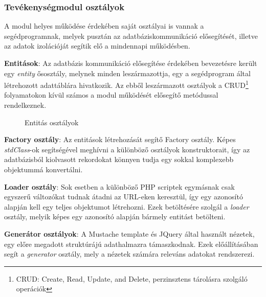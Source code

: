 \subsubsection{Tevékenységmodul osztályok}

A modul helyes működése érdekében saját osztályai is vannak a segédprogramnak, melyek pusztán az adatbáziskommunikáció elősegítését, illetve az adatok izolációját segítik elő a mindennapi működésben. 

\begin{compactitem}
    \item \textbf{Entitások}: Az adatbázis kommunikáció elősegítése érdekében bevezetésre került egy \textit{entity} ősosztály, melynek minden leszármazottja, egy a segédprogram által létrehozott adattáblára hivatkozik. Az ebből leszármazott osztályok a CRUD\footnote{CRUD: Create, Read, Update, and Delete, perzinsztens tárolásra szolgáló operációk} folyamatokon kívül számos a modul működését elősegítő metódussal rendelkeznek.

\begin{figure}[H]
	\caption{Entitás osztályok}
\end{figure}
    
    \item \textbf{Factory osztály}: Az entitások létrehozását segítő Factory osztály. Képes \textit{stdClass}-ok segítségével meghívni a különböző osztályok konstruktorait, így az adatbázisból kiolvasott rekordokat könnyen tudja egy sokkal komplexebb objektummá konvertálni.
    \item \textbf{Loader osztály}: Sok esetben a különböző PHP scriptek egymásnak csak egyszerű változókat tudnak átadni az URL-eken keresztül, így egy azonosító alapján kell egy teljes objektumot létrehozni. Ezek betöltésére szolgál a \textit{loader} osztály, melyik képes egy azonosító alapján bármely entitást betölteni.
    \item \textbf{Generátor osztályok}: A Mustache template és JQuery által használt nézetek, egy előre megadott struktúrájú adathalmazra támaszkodnak. Ezek előállításában segít a \textit{generator} osztály, mely a nézetek számára releváns adatokat rendszerezi.
\end{compactitem}

